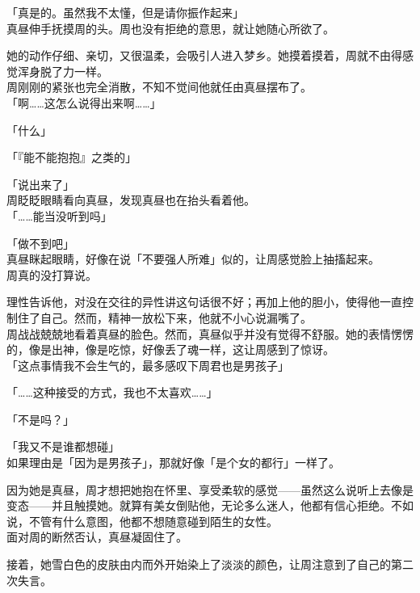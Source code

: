 「真是的。虽然我不太懂，但是请你振作起来」\\

真昼伸手抚摸周的头。周也没有拒绝的意思，就让她随心所欲了。

她的动作仔细、亲切，又很温柔，会吸引人进入梦乡。她摸着摸着，周就不由得感觉浑身脱了力一样。\\

周刚刚的紧张也完全消散，不知不觉间他就任由真昼摆布了。\\

「啊……这怎么说得出来啊……」

「什么」

「『能不能抱抱』之类的」

「说出来了」\\

周眨眨眼睛看向真昼，发现真昼也在抬头看着他。\\

「……能当没听到吗」

「做不到吧」\\

真昼眯起眼睛，好像在说「不要强人所难」似的，让周感觉脸上抽搐起来。\\

周真的没打算说。

理性告诉他，对没在交往的异性讲这句话很不好；再加上他的胆小，使得他一直控制住了自己。然而，精神一放松下来，他就不小心说漏嘴了。\\

周战战兢兢地看着真昼的脸色。然而，真昼似乎并没有觉得不舒服。她的表情愣愣的，像是出神，像是吃惊，好像丢了魂一样，这让周感到了惊讶。\\

「这点事情我不会生气的，最多感叹下周君也是男孩子」

「……这种接受的方式，我也不太喜欢……」

「不是吗？」

「我又不是谁都想碰」\\

如果理由是「因为是男孩子」，那就好像「是个女的都行」一样了。

因为她是真昼，周才想把她抱在怀里、享受柔软的感觉——虽然这么说听上去像是变态——并且触摸她。就算有美女倒贴他，无论多么迷人，他都有信心拒绝。不如说，不管有什么意图，他都不想随意碰到陌生的女性。\\

面对周的断然否认，真昼凝固住了。

接着，她雪白色的皮肤由内而外开始染上了淡淡的颜色，让周注意到了自己的第二次失言。\\

